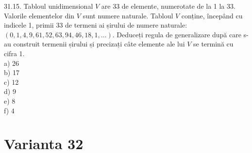 \begin{itemize}
\begin{enumerate}
31.15. Tabloul unidimensional $V$ are 33 de elemente, numerotate de la 1 la 33. Valorile elementelor din $V$ sunt numere naturale. Tabloul $V$ conține, începând cu indicele 1, primii 33 de termeni ai șirului de numere naturale: $(0,1,4,9,61,52,63,94,46,18,1, \ldots)$. Deduceți regula de generalizare după care s-au construit termenii șirului și precizați câte elemente ale lui $V$ se termină cu cifra 1.
\\
a) 26
\\
b) 17
\\
c) 12
\\
d) 9
\\
e) 8
\\
f) 4
\\

\section*{Varianta 32}


\end{enumerate}
\end{itemize}
